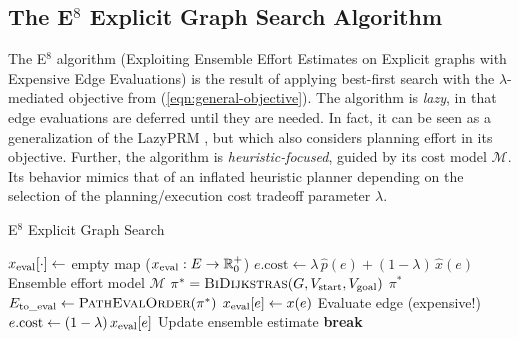 \subsection{The E$^8$ Explicit Graph Search Algorithm}
\label{sec:e8-planner}

The E$^8$ algorithm
(Exploiting Ensemble Effort Estimates
on Explicit graphs with Expensive Edge Evaluations)
is the result of applying
best-first search with the $\lambda$-mediated objective
from (\ref{eqn:general-objective}).
The algorithm is \emph{lazy},
in that edge evaluations are deferred until they are needed.
In fact, it can be seen as a generalization of the
LazyPRM \cite{bohlin2000lazyprm},
but which also considers planning effort in its objective.
Further,
the algorithm is \emph{heuristic-focused},
guided by its cost model $\mathcal{M}$.
Its behavior mimics that of an inflated heuristic planner
depending on the selection of the planning/execution cost
tradeoff parameter $\lambda$.

\begin{algorithm}[t]
\caption{E$^8$ Explicit Graph Search}
\label{alg:e8}
\begin{algorithmic}[1]
   \State $x_{\mbox{\scriptsize eval}}[\cdot] \leftarrow$ empty map
      ($x_{\mbox{\scriptsize eval}} : E \rightarrow \mathbb{R}_0^+$)
      \label{line:store-edge-eval-efforts}
      \State $e.{\mbox{cost}} \leftarrow
         \lambda \, \hat{p}(e) + (1 - \lambda) \, \hat{x}(e)$
         \Comment Ensemble effort model $\mathcal{M}$
         \label{line:edge-cost}
   \EndFor
   \Loop
         \label{line:best-first-start}
      \State $\pi^* = \mbox{\sc BiDijkstras}(G,
         V_{\mbox{\scriptsize start}}, V_{\mbox{\scriptsize goal}})$
         \label{line:e8-select-optimistic-path}
         \State \Return $\pi^*$
            \label{line:return-done}
      \EndIf
      \State $E_{\mbox{\scriptsize to\_eval}} \leftarrow
         \mbox{\sc PathEvalOrder}(\pi^*)$
         \label{line:path-eval-order}
         \State $x_{\mbox{\scriptsize eval}}[e] \leftarrow x(e)$
            \Comment Evaluate edge (expensive!)
            \label{line:evaulate-edge}
         \State $e.{\mbox{cost}} \leftarrow
            (1 - \lambda) \, x_{\mbox{\scriptsize eval}}[e]$
            \Comment Update ensemble estimate
            \label{line:update-estimate}
            \label{line:exec-cost-check}
            \State \textbf{break}
               \label{line:eval-break}
         \EndIf
      \EndFor
   \EndLoop
      \label{line:best-first-end}
   \EndProcedure
\end{algorithmic}
\end{algorithm}

